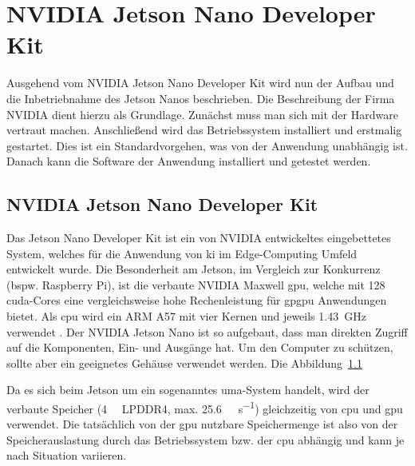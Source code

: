 %
%


\chapter{NVIDIA Jetson Nano Developer Kit}\label{JetsonNano:DeveloperKit}

Ausgehend vom NVIDIA Jetson Nano Developer Kit wird nun der Aufbau und die Inbetriebnahme des Jetson Nanos beschrieben. Die Beschreibung der Firma NVIDIA \cite{JetsonGettingStarted:2019} dient hierzu als Grundlage. Zunächst muss man sich mit der Hardware vertraut machen.  Anschließend wird das Betriebssystem installiert
und erstmalig gestartet. Dies ist ein Standardvorgehen, was von der Anwendung unabhängig ist. Danach kann die Software der Anwendung installiert und getestet werden.


\section{NVIDIA Jetson Nano Developer Kit}

Das Jetson Nano Developer Kit ist ein von NVIDIA entwickeltes eingebettetes System, welches für die Anwendung von \ac{ki} im Edge-Computing Umfeld entwickelt wurde. Die Besonderheit am Jetson, im Vergleich zur Konkurrenz (bspw. Raspberry Pi), ist die verbaute NVIDIA Maxwell \ac{gpu}, welche mit 128 \ac{cuda}-Cores eine vergleichsweise hohe Rechenleistung für \ac{gpgpu} Anwendungen bietet. Als \ac{cpu} wird ein ARM A57 mit vier Kernen und jeweils \SI{1.43}{\giga\hertz} verwendet \cite{JetsonDatasheet:2019}.
Der NVIDIA Jetson Nano ist so aufgebaut, dass man direkten Zugriff auf die Komponenten, Ein- und Ausgänge hat. Um den Computer zu schützen, sollte aber ein geeignetes Gehäuse verwendet werden. Die Abbildung~\ref{}

Da es sich beim Jetson um ein sogenanntes \ac{uma}-System handelt, wird der verbaute Speicher (\SI{4}{\giga\byte} LPDDR4, max. \SI{25.6}{\giga\byte\per\second}) gleichzeitig von \ac{cpu} und \ac{gpu} verwendet. Die tatsächlich von der \ac{gpu} nutzbare Speichermenge ist also von der Speicherauslastung durch das Betriebssystem bzw. der \ac{cpu} abhängig und kann je nach Situation variieren.

